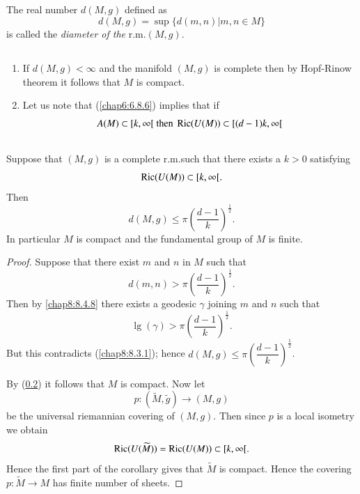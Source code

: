 \setcounter{subsection}{4}

\subsection{}\label{chap8:8.3.5}

\begin{defi*}
The real number $d(M,g)$ defined as
$$
d(M,g)=\sup \{d(m,n)|m,n\in M\}
$$
is called the {\em diameter of the } r.m.\@ $(M,g)$.
\end{defi*}

\subsection{}\label{chap8:8.3.6}


\begin{remarks*}
\begin{enumerate}
\renewcommand{\labelenumi}{\theenumi)}
\item If $d(M,g)<\infty$ and the manifold $(M,g)$ is complete then by
  Hopf-Rinow theorem it follows that $M$ is compact.

\item Let us note that (\ref{chap6:6.8.6}) implies that if 
$$
A(M)\subset [k,\infty[\text{ then } \operatorname{Ric}(U(M))\subset [(d-1)k,\infty[
$$
\end{enumerate}
\end{remarks*}

\subsection{}\label{chap8:8.3.7}

\begin{coro*}[Myers]
Suppose that $(M,g)$ is a complete r.m.\@ such that there exists a
$k>0$ satisfying
$$
\operatorname{Ric}(U(M))\subset [k,\infty[.
$$
Then
$$
d(M,g)\leq \pi\left(\frac{d-1}{k}\right)^{\frac{1}{2}}.
$$
In particular $M$ is compact and the fundamental group of $M$ is
finite. 
\end{coro*}

\begin{proof}
Suppose that there exist $m$ and $n$ in $M$ such that
$$
d(m,n)>\pi\left(\frac{d-1}{k}\right)^{\frac{1}{2}}.
$$
Then by \eqref{chap8:8.4.8} there exists a geodesic $\gamma$ joining $m$ and
$n$ such that
$$
\lg(\gamma)>\pi\left(\frac{d-1}{k}\right)^{\frac{1}{2}}.
$$
But \pageoriginale this contradicts (\ref{chap8:8.3.1}); hence
$d(M,g)\leq \pi\left(\dfrac{d-1}{k}\right)^{\frac{1}{2}}$.

By (\ref{chap8:8.3.6}) it follows that $M$ is compact. Now let
$$
p:(\widetilde{M},\widetilde{g})\to (M,g)
$$
be the universal riemannian covering of $(M,g)$. Then since $p$ is a
local isometry we obtain
$$
\operatorname{Ric}(U(\widetilde{M}))=\operatorname{Ric}(U(M))\subset [k,\infty[.
$$
Hence the first part of the corollary gives that $\widetilde{M}$ is
compact. Hence the covering $p:\widetilde{M}\to M$ has finite number
of sheets.
\end{proof}

